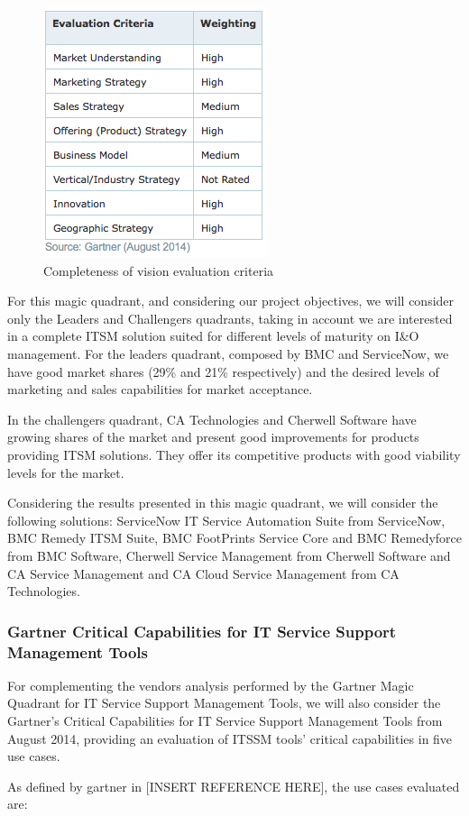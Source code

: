 \begin{figure}
\centering
\includegraphics{img/CompletenessOfVisionITSM.png}
\caption{Completeness of vision evaluation criteria}
\end{figure}

For this magic quadrant, and considering our project objectives, we will consider only the Leaders and Challengers quadrants, taking in account we are interested in a complete ITSM solution suited for different levels of maturity on I\&O management. For the leaders quadrant, composed by BMC and ServiceNow, we have good market shares (29\% and 21\% respectively) and the desired levels of marketing and sales capabilities for market acceptance.\par 
In the challengers quadrant, CA Technologies and Cherwell Software have growing shares of the market and present good improvements for products providing ITSM solutions. They offer its competitive products with good viability levels for the market.\par
Considering the results presented in this magic quadrant, we will consider the following solutions: ServiceNow IT Service Automation Suite from ServiceNow, BMC Remedy ITSM Suite, BMC FootPrints Service Core and BMC Remedyforce from BMC Software, Cherwell Service Management from Cherwell Software and CA Service Management and CA Cloud Service Management from CA Technologies.\par

\subsubsection{Gartner Critical Capabilities for IT Service Support Management Tools}

For complementing the vendors analysis performed by the Gartner Magic Quadrant for IT Service Support Management Tools, we will also consider the Gartner's Critical Capabilities for IT Service Support Management Tools from August 2014, providing an evaluation of ITSSM tools' critical capabilities in five use cases.\par
As defined by gartner in [INSERT REFERENCE HERE], the use cases evaluated are:

